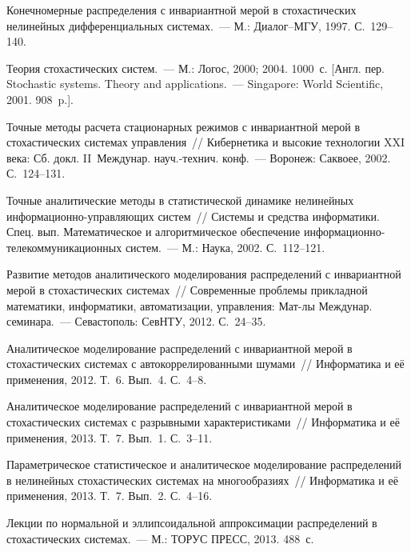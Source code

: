 \begin{multicols}{2}
{{\begin{thebibliography}{99}
 Конечномерные распределения с инвариантной мерой в
стохастических нелинейных дифференциальных системах.~--- М.:
Диа\-лог--МГУ, 1997. С.~129--140.

Теория стохастических систем.~--- М.: Логос, 2000; 2004. 1000~с.
[Англ. пер. Stochastic systems. Theory and  applications.~---
Singapore: World Scientific, 2001. 908~p.].


Точные методы расчета стационарных режимов с инвариантной мерой в
стохастических системах управления~// Кибернетика и высокие
технологии XXI века: Сб. докл.  II~Междунар.
на\-уч.-тех\-нич. конф.~--- Воронеж: Саквоее, 2002.
С.~124--131.

Точные аналитические методы в статистической динамике нелинейных
ин\-фор\-ма\-ци\-он\-но-управ\-ля\-ющих сис\-тем~//
Системы и средства информатики.
Спец. вып. Математическое и алгоритмическое обеспечение
ин\-фор\-ма\-ци\-он\-но-те\-ле\-ком\-му\-ни\-ка\-ци\-он\-ных сис\-тем.~---
М.: Наука, 2002. С.~112--121.


 Развитие методов аналитического моделирования
распределений с инвариантной мерой в стохастических системах~//
Современные проблемы прикладной математики, информатики, автоматизации,
управления: Мат-лы Междунар. семинара.~--- Севастополь:  СевНТУ, 2012.
С.~24--35.

 Аналитическое моделирование распределений с
инвариантной мерой в стохастических системах с автокоррелированными шумами~//
Информатика и её применения, 2012. Т.~6. Вып.~4. С.~4--8.

Аналитическое моделирование распределений с инвариантной мерой в
стохастических системах с разрывными характеристиками~// Информатика
и её применения, 2013. Т.~7. Вып.~1.  С.~3--11.

Параметрическое статистическое и аналитическое моделирование распределений
в нелинейных стохастических системах на многообразиях~//
Информатика и её применения, 2013. Т.~7. Вып.~2. С.~4--16.

Лекции по нормальной и эллипсоидальной аппроксимации распределений в
стохастических сис\-те\-мах.~--- М.: ТОРУС ПРЕСС, 2013. 488~с.


\end{thebibliography}}}
\end{multicols}
